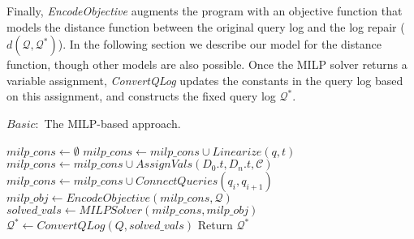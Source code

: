 Finally, \emph{EncodeObjective} augments the program with an objective
function that models the distance function between the original query
log and the log repair ($d(\mathcal{Q},\mathcal{Q}^*)$). In the
following section we describe our model for the distance function,
though other models are also possible. Once the MILP solver returns a
variable assignment, \textit{ConvertQLog} updates the constants in the
query log based on this assignment, and constructs the fixed query log
$\mathcal{Q}^*$.





\begin{algorithm}[t]
\caption{$Basic:$ The MILP-based approach.}
\label{alg:basic}
\scriptsize
\begin{algorithmic}[1]
\STATE $milp\_cons \leftarrow \emptyset$
\STATE $milp\_cons \leftarrow milp\_cons \cup Linearize(q, t)$
\ENDFOR
\STATE $milp\_cons \leftarrow milp\_cons \cup AssignVals(D_0.t, D_n.t, \mathcal{C})$
\STATE $milp\_cons \leftarrow milp\_cons \cup ConnectQueries(q_i, q_{i+1})$
\ENDFOR
\ENDFOR 
\STATE $milp\_obj \leftarrow EncodeObjective(milp\_cons, \mathcal{Q})$
\STATE $solved\_vals \leftarrow MILPSolver(milp\_cons, milp\_obj)$
\STATE $\mathcal{Q}^* \leftarrow ConvertQLog(Q, solved\_vals)$
\STATE Return $\mathcal{Q}^*$
\end{algorithmic}
\end{algorithm}



















